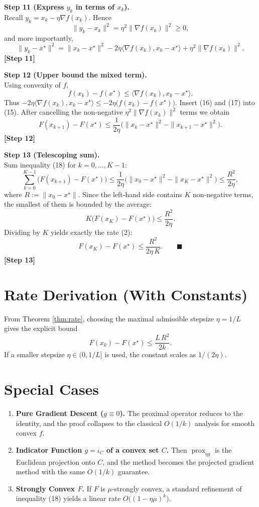 \documentclass{article}
\newcommand{\prox}{\operatorname{prox}}
\begin{document}
\noindent\textbf{Step 11 (Express $y_{k}$ in terms of $x_{k}$).}\\
Recall $y_{k}=x_{k}-\eta\nabla f(x_{k})$. Hence
\[
\|y_{k}-x_{k}\|^{2}= \eta^{2}\|\nabla f(x_{k})\|^{2}\ge 0,
\]
and more importantly,
\[
\|y_{k}-x^{\star}\|^{2}
= \|x_{k}-x^{\star}\|^{2}
-2\eta\langle\nabla f(x_{k}),x_{k}-x^{\star}\rangle
+\eta^{2}\|\nabla f(x_{k})\|^{2}.
\tag{16}
\]
\textbf{[Step 11]}

\noindent\textbf{Step 12 (Upper bound the mixed term).}\\
Using convexity of $f$,
\[
f(x_{k})-f(x^{\star})\le \langle\nabla f(x_{k}),x_{k}-x^{\star}\rangle .
\tag{17}
\]
Thus $-2\eta\langle\nabla f(x_{k}),x_{k}-x^{\star}\rangle\le -2\eta\bigl(f(x_{k})-f(x^{\star})\bigr)$.
Insert (16) and (17) into (15). After cancelling the non‑negative $\eta^{2}\|\nabla f(x_{k})\|^{2}$ terms we obtain
\[
F(x_{k+1})-F(x^{\star})
\le \frac{1}{2\eta}
\bigl(\|x_{k}-x^{\star}\|^{2}
      -\|x_{k+1}-x^{\star}\|^{2}\bigr).
\tag{18}
\]
\textbf{[Step 12]}

\noindent\textbf{Step 13 (Telescoping sum).}\\
Sum inequality (18) for $k=0,\dots, K-1$:
\[
\sum_{k=0}^{K-1}\bigl(F(x_{k+1})-F(x^{\star})\bigr)
\le \frac{1}{2\eta}\bigl(\|x_{0}-x^{\star}\|^{2}
      -\|x_{K}-x^{\star}\|^{2}\bigr)
\le \frac{R^{2}}{2\eta},
\tag{19}
\]
where $R:=\|x_{0}-x^{\star}\|$.  
Since the left‑hand side contains $K$ non‑negative terms, the smallest of them is bounded by the average:
\[
K\bigl(F(x_{K})-F(x^{\star})\bigr)
\le \frac{R^{2}}{2\eta}.
\tag{20}
\]
Dividing by $K$ yields exactly the rate (2):
\[
F(x_{K})-F(x^{\star})\le\frac{R^{2}}{2\eta\,K}.
\qquad\blacksquare
\]
\textbf{[Step 13]}

\section*{Rate Derivation (With Constants)}
From Theorem \ref{thm:rate}, choosing the maximal admissible stepsize $\eta=1/L$ gives the explicit bound
\[
F(x_{k})-F(x^{\star})\le \frac{L\,R^{2}}{2k}.
\]
If a smaller stepsize $\eta\in(0,1/L]$ is used, the constant scales as $1/(2\eta)$.

\section*{Special Cases}
\begin{enumerate}[noitemsep]
\item \textbf{Pure Gradient Descent ($g\equiv0$).}  
The proximal operator reduces to the identity, and the proof collapses to the classical $O(1/k)$ analysis for smooth convex $f$.
\item \textbf{Indicator Function $g=\iota_{C}$ of a convex set $C$.}  
Then $\prox_{\eta g}$ is the Euclidean projection onto $C$, and the method becomes the projected gradient method with the same $O(1/k)$ guarantee.
\item \textbf{Strongly Convex $F$.}  
If $F$ is $\mu$‑strongly convex, a standard refinement of inequality (18) yields a linear rate $O\bigl((1-\eta\mu)^{k}\bigr)$.
\end{enumerate}
\end{document}

